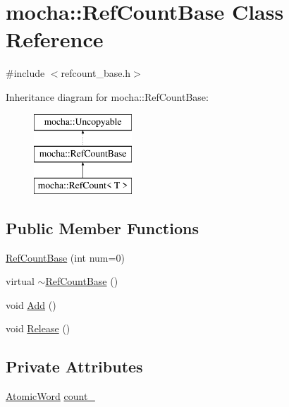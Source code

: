 \hypertarget{classmocha_1_1_ref_count_base}{
\section{mocha::RefCountBase Class Reference}
\label{classmocha_1_1_ref_count_base}
}


{\ttfamily \#include $<$refcount\_\-base.h$>$}

Inheritance diagram for mocha::RefCountBase:\begin{figure}[H]
\begin{center}
\leavevmode
\includegraphics[height=3.000000cm]{classmocha_1_1_ref_count_base}
\end{center}
\end{figure}
\subsection*{Public Member Functions}
\begin{DoxyCompactItemize}
\item 
\hyperlink{classmocha_1_1_ref_count_base_ad603e37d9786aef451a5cf6c36321617}{RefCountBase} (int num=0)
\item 
virtual \hyperlink{classmocha_1_1_ref_count_base_a58406348c6968c4be8be4945cc0f83a9}{$\sim$RefCountBase} ()
\item 
void \hyperlink{classmocha_1_1_ref_count_base_a37ccb66221b1a62b8c4f5a592c27fcb3}{Add} ()
\item 
void \hyperlink{classmocha_1_1_ref_count_base_a851c244d63d057d7889f1fda44a6d696}{Release} ()
\end{DoxyCompactItemize}
\subsection*{Private Attributes}
\begin{DoxyCompactItemize}
\item 
\hyperlink{atomic_8h_a4fde06794efa6f001ed354067fdd8133}{AtomicWord} \hyperlink{classmocha_1_1_ref_count_base_a8c4603d1cff5f998a1ad26fa24f68664}{count\_\-}
\end{DoxyCompactItemize}


